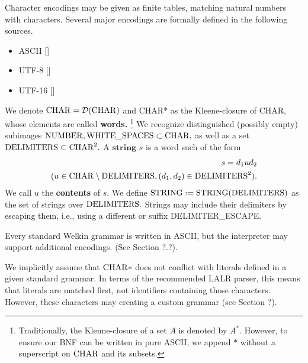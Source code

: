 Character encodings may be given as finite tables, matching natural numbers with characters. Several major encodings are formally defined in the following sources.
\begin{itemize}
	\item ASCII []
	\item UTF-8 []
	\item UTF-16 []
\end{itemize}

We denote $\mathrm{CHAR} = \mathcal{D}(\mathrm{CHAR})$ and CHAR* as the
Kleene-closure of CHAR, whose elements are called \textbf{words.}
\footnote{Traditionally, the Klenne-closure of a set $A$ is denoted by $A^{*}.$ However, to ensure our BNF
can be written in pure ASCII, we append $*$ without a superscript on $\mathrm{CHAR}$ and its subsets.}
We recognize distinguished (possibly empty) subimages $\mathrm{NUMBER}, \mathrm{WHITE\_SPACES} \subset \mathrm{CHAR},$ as well as a set $\mathrm{DELIMITERS} \subset \mathrm{CHAR}^{2}.$ A $\textbf{string}$ $s$ is a word such of the form
\begin{align*}
s = d_{1}ud_{2} \\ (u \in \mathrm{CHAR} \setminus \mathrm{DELIMITERS}, (d_{1}, d_{2}) \in \mathrm{DELIMITERS}^{2}).
\end{align*}
We call $u$ the \textbf{contents} of $s.$ We define $\mathrm{STRING} := \mathrm{STRING}(\mathrm{DELIMITERS})$ as the set of strings over $\mathrm{DELIMITERS}.$ Strings may include their delimiters by escaping them, i.e., using a different or suffix DELIMITER\_ESCAPE.

Every standard Welkin grammar is written in ASCII, but the interpreter may support additional encodings. (See Section ?.?).

We implicitly assume that $\mathrm{CHAR}*$ does not conflict with literals defined in a given standard grammar. In terms of the recommended LALR parser, this means that literals are matched first, not identifiers containing those characters. However, these characters may creating a custom grammar (see Section ?).


